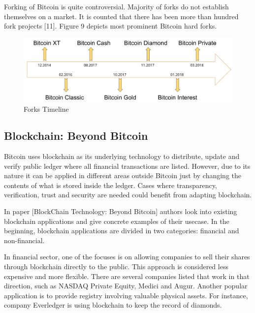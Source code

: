 \documentclass[conference,compsoc]{IEEEtran}
\begin{document}
Forking of Bitcoin is quite controversial. 
Majority of forks do not establish themselves on a market. 
It is counted that there has been more than hundred fork projects [11].
Figure 9 depicts most prominent Bitcoin hard forks. 

\begin{figure}[h]
  \centering
  \includegraphics[width=.45\textwidth]{graphics/timeline.png}
  \caption{Forks Timeline}
  \label{fig:fig9}
\end{figure}


\subsection{Blockchain: Beyond Bitcoin}
Bitcoin uses blockchain as its underlying technology to distribute, update and verify public ledger where all financial transactions are listed. 
However, due to its nature it can be applied in different areas outside Bitcoin just by changing the contents of what is stored inside the ledger. 
Cases where transparency, verification, trust and security are needed could benefit from adapting blockchain.

In paper [BlockChain Technology: Beyond Bitcoin] authors look into existing blockchain applications and give concrete examples of their usecase.
In the beginning, blockchain applications are divided in two categories: financial and non-financial.

In financial sector, one of the focuses is on allowing companies to sell their shares through blockchain directly to the public. 
This approach is considered less expensive and more flexible. 
There are several companies listed that work in that direction, such as NASDAQ Private Equity, Medici and Augur.
Another popular application is to provide registry involving valuable physical assets. 
For instance, company Everledger is using blockchain to keep the record of diamonds.
\end{document}
